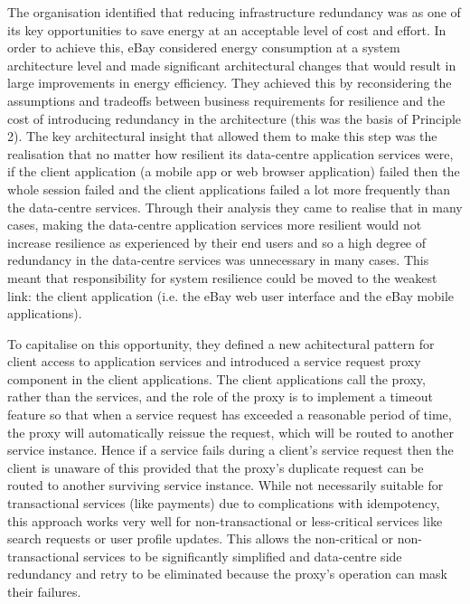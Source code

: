 The organisation identified that reducing infrastructure redundancy was as one of its key opportunities to save energy at an acceptable level of cost and effort. In order to achieve this, eBay considered energy consumption at a system architecture level and made significant architectural changes that would result in large improvements in energy efficiency.  They achieved this by reconsidering the assumptions and tradeoffs between business requirements for resilience and the cost of introducing redundancy in the architecture (this was the basis of Principle 2).  The key architectural insight that allowed them to make this step was the realisation that no matter how resilient its data-centre application services were, if the client application (a mobile app or web browser application) failed then the whole session failed and the client applications failed a lot more frequently than the data-centre services.  Through their analysis they came to realise that in many cases, making the data-centre application services more resilient would not increase resilience as experienced by their end users and so a high degree of redundancy in the data-centre services was unnecessary in many cases. This meant that responsibility for system resilience could be moved to the weakest link: the client application (i.e. the eBay web user interface and the eBay mobile applications).

To capitalise on this opportunity, they defined a new achitectural pattern for client access to application services and introduced a service request proxy component in the client applications. The client applications call the proxy, rather than the services, and the role of the proxy is to implement a timeout feature so that when a service request has exceeded a reasonable period of time, the proxy will automatically reissue the request, which will be routed to another service instance.  Hence if a service fails during a client's service request then the client is unaware of this provided that the proxy's duplicate request can be routed to another surviving service instance.  While not necessarily suitable for transactional services (like payments) due to complications with idempotency, this approach works very well for non-transactional or less-critical services like search requests or user profile updates.  This allows the non-critical or non-transactional services to be significantly simplified and data-centre side redundancy and retry to be eliminated because the proxy's operation can mask their failures.

